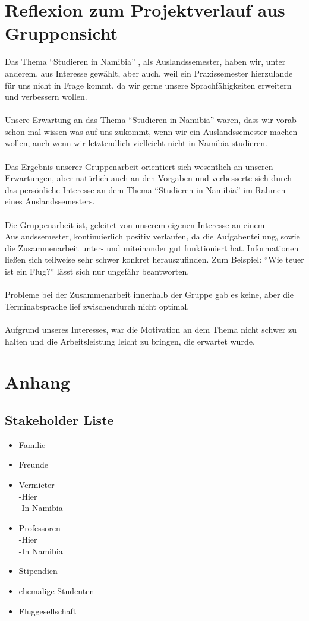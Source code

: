 \documentclass[11pt]{article}
\begin{document}
\section{Reflexion zum Projektverlauf aus Gruppensicht}
Das Thema "`Studieren in Namibia"' , als Auslandssemester, haben wir, unter anderem, 
aus Interesse gewählt, aber auch, weil ein Praxissemester hierzulande für uns nicht 
in Frage kommt, da wir gerne unsere Sprachfähigkeiten erweitern und verbessern wollen.
\\\\
Unsere Erwartung an das Thema "`Studieren in Namibia"' waren, dass wir vorab schon mal
wissen was auf uns zukommt, wenn wir ein Auslandssemester machen wollen, auch
wenn wir letztendlich vielleicht nicht in Namibia studieren.
\\\\
Das Ergebnis unserer Gruppenarbeit orientiert sich wesentlich an unseren Erwartungen,
aber natürlich auch an den Vorgaben und verbesserte sich durch das persönliche Interesse
an dem Thema "`Studieren in Namibia"' im Rahmen eines Auslandssemesters.
\\\\
Die Gruppenarbeit ist, geleitet von unserem eigenen Interesse an einem Auslandssemester,
kontinuierlich positiv verlaufen, da die Aufgabenteilung, sowie die Zusammenarbeit
unter- und miteinander gut funktioniert hat.
Informationen ließen sich teilweise sehr schwer konkret herauszufinden.
Zum Beispiel: "`Wie teuer ist ein Flug?"' lässt sich nur ungefähr beantworten.
\\\\
Probleme bei der Zusammenarbeit innerhalb der Gruppe gab es keine, aber die 
Terminabsprache lief zwischendurch nicht optimal.
\\\\
Aufgrund unseres Interesses, war die Motivation an dem Thema nicht schwer zu halten
und die Arbeitsleistung leicht zu bringen, die erwartet wurde.

\newpage

\section{Anhang}
\subsection{Stakeholder Liste}
\begin{itemize}
\item Familie
\item Freunde
\item Vermieter
	\\-Hier
	\\-In Namibia
\item Professoren
	\\-Hier
	\\-In Namibia
\item Stipendien
\item ehemalige Studenten
\item Fluggesellschaft
\end{itemize}
\end{document}
